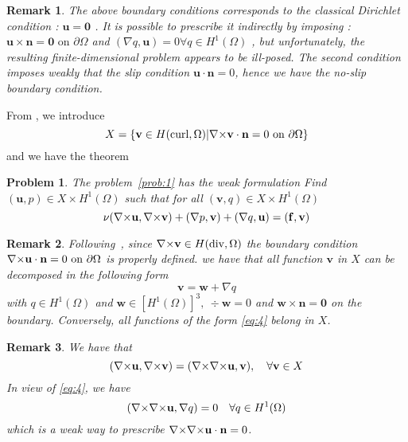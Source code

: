 \documentclass{article}
\newtheorem{problem}{Problem}
\newtheorem{remark}{Remark}
\newcommand{\Hdiv}{\ensuremath{H(\mathrm{div},\Omega)}\xspace}
\newcommand{\Hcurl}{\ensuremath{H(\mathrm{curl},\Omega)}\xspace}
\newcommand{\Hp}[1][1]{\ensuremath{H^{#1}(\Omega)}\xspace}
\begin{document}
\begin{remark}
  \label{rem:6}
  The above boundary conditions corresponds to the classical Dirichlet condition
  : $\mathbf{u} = \mathbf{0}$ . It is possible to prescribe it indirectly by
  imposing : $\mathbf{u}\times \mathbf{n} = \mathbf{0} \mbox{ on } \partial
  \Omega$ and $(\nabla q, \mathbf{u}) = 0 \forall q \in \Hp$ , but
  unfortunately, the resulting finite-dimensional problem appears to be
  ill-posed. The second condition imposes weakly that the slip condition
  $\mathbf{u} \cdot \mathbf{n} = 0$, hence we have the no-slip boundary
  condition.
\end{remark}

From \cite{girault90-1}, we introduce
\begin{equation*}
  X = \{ \mathbf{v} \in \Hcurl | \curl \mathbf{v} \cdot \mathbf{n} = 0 \mbox{
  on } \partial \Omega \}
\end{equation*}
and we have the theorem
\begin{problem}
  \label{prob:4}
  The problem~\ref{prob:1} has the weak formulation
  Find $(\mathbf{u},p)  \in X \times \Hp$ such that
  for all $(\mathbf{v},q) \in X \times \Hp$
  \begin{equation}
    \label{eq:3}
    \nu ({\nabla\times} \mathbf{u}, {\nabla\times} \mathbf{v} ) + (\nabla p, \mathbf{v}) + (\nabla
    q, \mathbf{u} ) = (\mathbf{f}, \mathbf{v})
  \end{equation}
\end{problem}

\begin{remark}
  \label{rem:1}
  Following~\cite{girault90-1}, since $\curl\mathbf{v} \in \Hdiv$ the boundary condition ${\nabla\times} \mathbf{u}
  \cdot \mathbf{n}=0 \mbox{ on } \partial \Omega $ is properly
  defined. we have that all function $\mathbf{v}$ in $X$ can be
  decomposed in the following form
  \begin{equation}
    \label{eq:4}
    \mathbf{v} = \mathbf{w} + \nabla q
  \end{equation}
  with $q \in \Hp$ and $\mathbf{w} \in [\Hp]^3,\ \div \mathbf{w}
  = 0 $ and $\mathbf{w} \times \mathbf{n} = \mathbf{0}$ on the
  boundary. Conversely, all functions of the form \eqref{eq:4} belong in $X$.
\end{remark}

\begin{remark}
  \label{rem:2}
  We have that
  \begin{equation}
    \label{eq:5}
    ({\nabla\times}\mathbf{u}, {\nabla\times}\mathbf{v}) = ({\nabla\times} {\nabla\times} \mathbf{u}, \mathbf{v} ),
    \quad \forall \mathbf{v} \in X
  \end{equation}
In view of \eqref{eq:4}, we have
\begin{equation}
  \label{eq:6}
  (\curl \curl \mathbf{u}, \nabla q ) =  0\quad \forall q \in \Hp
\end{equation}
which is a weak way to prescribe ${\nabla\times} {\nabla\times} \mathbf{u} \cdot \mathbf{n} = 0$.
\end{remark}
\end{document}
